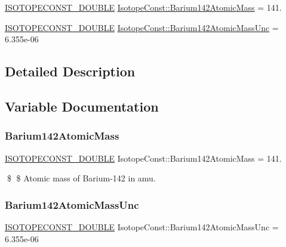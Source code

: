 \begin{DoxyCompactItemize}
\item 
\mbox{\hyperlink{group___isotope_const-_macros_ga8f45a7272ce02c0b4c65c44636ed719a}{I\+S\+O\+T\+O\+P\+E\+C\+O\+N\+S\+T\+\_\+\+D\+O\+U\+B\+LE}} \mbox{\hyperlink{group___isotope_const-_barium-_ba142_ga1efb48bea0e3c4009f26204a2ee94390}{Isotope\+Const\+::\+Barium142\+Atomic\+Mass}} = 141.
\item 
\mbox{\hyperlink{group___isotope_const-_macros_ga8f45a7272ce02c0b4c65c44636ed719a}{I\+S\+O\+T\+O\+P\+E\+C\+O\+N\+S\+T\+\_\+\+D\+O\+U\+B\+LE}} \mbox{\hyperlink{group___isotope_const-_barium-_ba142_ga322d2418bbd550f751d981695ef9efba}{Isotope\+Const\+::\+Barium142\+Atomic\+Mass\+Unc}} = 6.\+355e-\/06
\end{DoxyCompactItemize}


\subsection{Detailed Description}


\subsection{Variable Documentation}
\mbox{\label{group___isotope_const-_barium-_ba142_ga1efb48bea0e3c4009f26204a2ee94390}} 
\subsubsection{\texorpdfstring{Barium142\+Atomic\+Mass}{Barium142AtomicMass}}
{\footnotesize\ttfamily \mbox{\hyperlink{group___isotope_const-_macros_ga8f45a7272ce02c0b4c65c44636ed719a}{I\+S\+O\+T\+O\+P\+E\+C\+O\+N\+S\+T\+\_\+\+D\+O\+U\+B\+LE}} Isotope\+Const\+::\+Barium142\+Atomic\+Mass = 141.}

\$ \$ Atomic mass of Barium-\/142 in amu. \mbox{\label{group___isotope_const-_barium-_ba142_ga322d2418bbd550f751d981695ef9efba}} 
\subsubsection{\texorpdfstring{Barium142\+Atomic\+Mass\+Unc}{Barium142AtomicMassUnc}}
{\footnotesize\ttfamily \mbox{\hyperlink{group___isotope_const-_macros_ga8f45a7272ce02c0b4c65c44636ed719a}{I\+S\+O\+T\+O\+P\+E\+C\+O\+N\+S\+T\+\_\+\+D\+O\+U\+B\+LE}} Isotope\+Const\+::\+Barium142\+Atomic\+Mass\+Unc = 6.\+355e-\/06}

